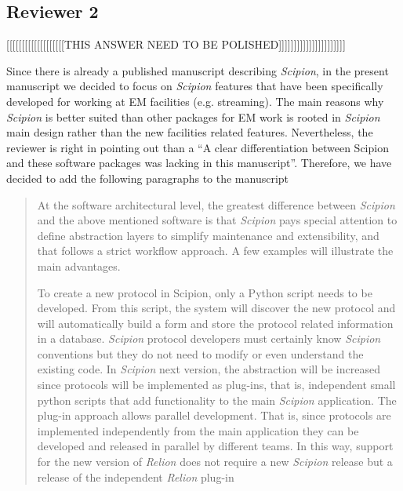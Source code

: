 \documentclass[a4paper,12pt]{article}
\def\scipion{\textit{Scipion}\xspace}
\begin{document}
\begin{reviewer}
\section*{Reviewer 2}



[[[[[[[[[[[[[[[[[[[THIS ANSWER NEED TO BE POLISHED]]]]]]]]]]]]]]]]]]]]]]

\reply Since there is already a published manuscript describing \scipion, in the present manuscript  we decided to focus on \scipion features that have been specifically developed for working at EM facilities (e.g. streaming). The main reasons why \scipion is better suited than other packages for EM work is rooted in \scipion main design rather than the new facilities related features. Nevertheless, the reviewer is right in pointing out than a ``A clear differentiation between Scipion and these software packages was lacking in this manuscript''. Therefore, we have decided to add the following paragraphs to the manuscript

\begin{quote}

At the software architectural level,  the greatest difference 
between \scipion and the above mentioned software is that  \scipion pays 
special attention to define abstraction layers to simplify maintenance
and extensibility, and that follows a strict workflow approach. A few examples will illustrate the main advantages.

To create a new protocol in Scipion,
only a Python script needs to be developed. From this script, the
system will discover the new protocol and will automatically build
a form and store the protocol related information in a database.
\scipion protocol developers must certainly know \scipion conventions
but they do not need to modify or even understand the existing code.
In  \scipion next version, the abstraction will be increased
since protocols will be implemented as plug-ins,
that is, independent small python scripts  that add functionality to the main
\scipion application. The plug-in approach allows parallel development. That is,  
since protocols are implemented independently from the main application
they can be developed and released in parallel by different teams. In this way, support for the new version of \textit{Relion} does not require a new \scipion release but
a release of the independent \textit{Relion} plug-in


\end{quote}
\end{reviewer}
\end{document}
